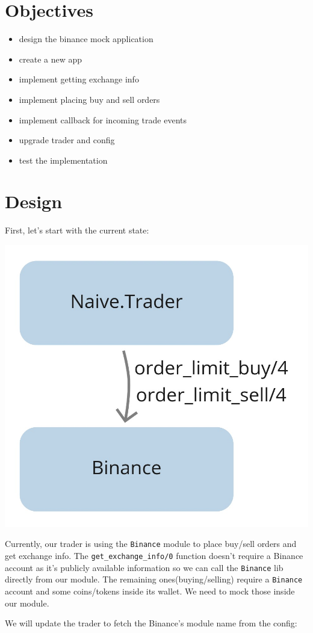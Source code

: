 \documentclass[
  oneside]{book}
\providecommand{\tightlist}{%
  \setlength{\itemsep}{0pt}\setlength{\parskip}{0pt}}
\begin{document}
\section{Objectives}\label{objectives-3}

\begin{itemize}
\tightlist
\item
  design the binance mock application
\item
  create a new app
\item
  implement getting exchange info
\item
  implement placing buy and sell orders
\item
  implement callback for incoming trade events
\item
  upgrade trader and config
\item
  test the implementation
\end{itemize}

\section{Design}\label{design-1}

First, let's start with the current state:

\begin{center}\includegraphics[width=0.3\linewidth]{images/chapter_04_01_current_state} \end{center}

Currently, our trader is using the \texttt{Binance} module to place buy/sell
orders and get exchange info.
The \texttt{get\_exchange\_info/0} function doesn't require a Binance account as it's publicly available information so we can call the \texttt{Binance} lib directly from our module.
The remaining ones(buying/selling) require a \texttt{Binance} account and some coins/tokens inside its wallet. We need to mock those inside our module.

\newpage

We will update the trader to fetch the Binance's module name from the config:
\end{document}
